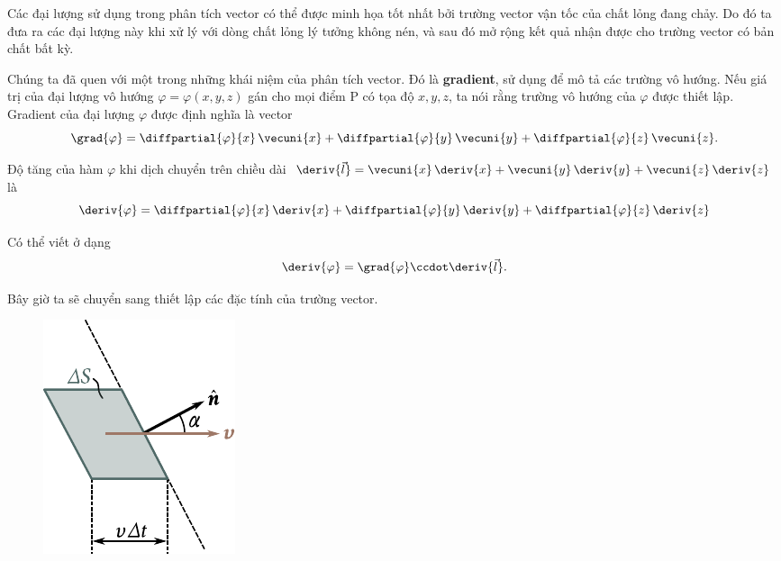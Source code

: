 Các đại lượng sử dụng trong phân tích vector có thể được minh họa tốt nhất bởi trường vector vận tốc của chất lỏng đang chảy. Do đó ta đưa ra các đại lượng này khi xử lý với dòng chất lỏng lý tưởng không nén, và sau đó mở rộng kết quả nhận được cho trường vector có bản chất bất kỳ.

Chúng ta đã quen với một trong những khái niệm của phân tích vector. Đó là \textbf{gradient}, sử dụng để mô tả các trường vô hướng. Nếu giá trị của đại lượng vô hướng $\varphi=\varphi(x, y, z)$ gán cho mọi điểm P có tọa độ $x, y, z$, ta nói rằng trường vô hướng của $\varphi$ được thiết lập. Gradient của đại lượng $\varphi$ được định nghĩa là vector
\begin{equation}\label{eq:1_68}
	\grad{\varphi} = \diffpartial{\varphi}{x}\,\vecuni{x} + \diffpartial{\varphi}{y}\,\vecuni{y} + \diffpartial{\varphi}{z}\,\vecuni{z}.
\end{equation}

Độ tăng của hàm $\varphi$ khi dịch chuyển trên chiều dài $\deriv{\vec{l}}=\vecuni{x}\,\deriv{x}+\vecuni{y}\,\deriv{y}+\vecuni{z}\,\deriv{z}$ là
\begin{equation*}
	\deriv{\varphi} = \diffpartial{\varphi}{x}\,\deriv{x} + \diffpartial{\varphi}{y}\,\deriv{y} + \diffpartial{\varphi}{z}\,\deriv{z}
\end{equation*}

\noindent
Có thể viết ở dạng
\begin{equation}\label{eq:1_69}
	\deriv{\varphi} = \grad{\varphi} \ccdot \deriv{\vec{l}}.
\end{equation}

Bây giờ ta sẽ chuyển sang thiết lập các đặc tính của trường vector.

\begin{figure}[!htb]
	\begin{center}
		\includegraphics[scale=1]{figures/ch_01/fig_1_19.pdf}
		\caption[]{}
		\label{fig:1_19}
	\end{center}
	\vspace{-0.8cm}
\end{figure}

